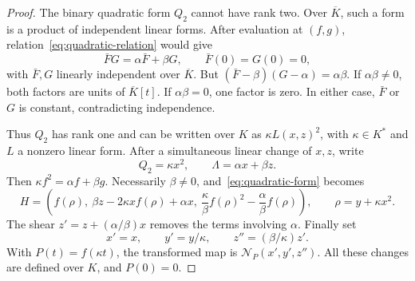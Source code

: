 \documentclass[10pt,a4paper]{amsart}
\newcommand{\Ncal}{\mathcal N}
\begin{document}
\begin{proof}
The binary quadratic form $Q_2$ cannot have rank two. Over $\overline K$, such a form is a product of independent linear forms. After evaluation at $(f,g)$, relation~\eqref{eq:quadratic-relation} would give
\[
  \bar{F}G=\alpha \bar{F}+\beta G,\qquad \bar{F}(0)=G(0)=0,
\]
with $\bar{F},G$ linearly independent over $ \overline K$. But
$(\bar{F}-\beta)(G-\alpha)=\alpha\beta$. If $\alpha\beta\neq0$, both factors are units of $\overline K[t]$. If $\alpha\beta=0$, one factor is zero. In either case, $\bar{F}$ or $G$ is constant, contradicting independence.

Thus $Q_2$ has rank one and can be written over $K$ as $\kappa L(x,z)^2$, with $\kappa\in K^*$ and $L$ a nonzero linear form. After a simultaneous linear change of $x,z$, write
\[
 Q_2=\kappa x^2,\qquad \Lambda=\alpha x+\beta z.
\]
Then $\kappa f^2=\alpha f+\beta g$. Necessarily $\beta\neq0$, and~\eqref{eq:quadratic-form} becomes
\begin{equation}\label{eq:precanonical}
 H=\left(f(\rho),\ \beta z-2\kappa xf(\rho)+\alpha x,
 \ \frac{\kappa}{\beta}f(\rho)^2-\frac{\alpha}{\beta}f(\rho)\right),
 \qquad \rho=y+\kappa x^2.
\end{equation}
The shear $z'=z+(\alpha/\beta)x$ removes the terms involving $\alpha$. Finally set
\[
 x'=x,\qquad y'=y/\kappa,\qquad z''=(\beta/\kappa)z'.
\]
With $P(t)=f(\kappa t)$, the transformed map is $\Ncal_P(x',y',z'')$. All these changes are defined over $K$, and $P(0)=0$.
\end{proof}
\end{document}
